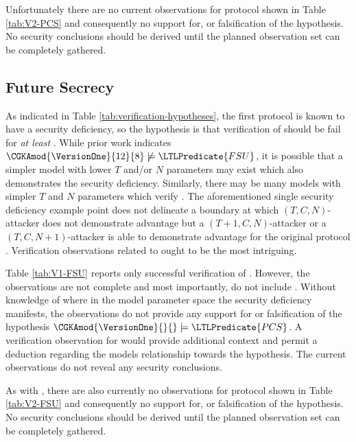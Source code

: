 Unfortunately there are no current observations for protocol \VersionTwo shown in Table \ref{tab:V2-PCS} and consequently no support for, or falsification of the hypothesis.
No security conclusions should be derived until the planned observation set can be completely gathered. 


\hypertarget{sec:future-secrecy}{%
\subsection{Future Secrecy}\label{sec:future-secrecy}}

As indicated in Table \ref{tab:verification-hypotheses}, the first protocol \VersionOne is known to have a  security deficiency, so the hypothesis is that verification of  should be fail for \emph{at least} .
While prior work \autocite{alwen2020security} indicates \( \CGKAmod{\VersionOne}{12}{8} \not \models \LTLPredicate{FSU} \), it is possible that a simpler model with lower \(T\) and/or \(N\) parameters may exist which also demonstrates the  security deficiency.
Similarly, there may be many  models with simpler \(T\) and \(N\) parameters which verify .
The aforementioned single  security deficiency example point does not delineate a boundary at which \((T, C, N)\)-attacker does not demonstrate advantage but a \((T+1, C, N)\)-attacker or a \((T, C, N+1)\)-attacker is able to demonstrate advantage for the original protocol \VersionOne.
Verification observations related to  ought to be the most intriguing.

Table \ref{tab:V1-FSU} reports only successful verification of .
However, the observations are not complete and most importantly, do not include .
Without knowledge of where in the  model parameter space the  security deficiency manifests, the observations do not provide any support for or falsification of the hypothesis \( \CGKAmod{\VersionOne}{}{} \models \LTLPredicate{PCS} \).
A verification observation for  would provide additional context and permit a deduction regarding the models relationship towards the hypothesis.
The current observations do not reveal any security conclusions.

As with , there are also currently no  observations for protocol \VersionTwo shown in Table \ref{tab:V2-FSU} and consequently no support for, or falsification of the hypothesis.
No security conclusions should be derived until the planned observation set can be completely gathered.
